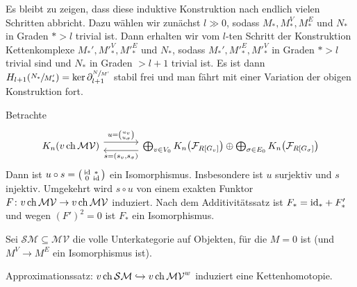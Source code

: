 \begin{beweis}
	Es bleibt zu zeigen, dass diese induktive Konstruktion nach endlich vielen Schritten abbricht. 
	Dazu wählen wir zunächst $l \gg 0$, sodass $M_*,M_*^V,M_*^E$ und $N_*$ in Graden $* > l$ trivial ist.
	Dann erhalten wir vom $l$-ten Schritt der Konstruktion Kettenkomplexe $M_*', {M'}_*^V, {M'}_*^E$ und $N_*$, sodass $M_*',{M'}_*^E, {M'}_*^V$ in Graden $* > l$ trivial sind und $N_*$ in Graden $> l+1$ trivial ist.
	Es ist dann $H_{l+1} \enbrace*{\sfrac{N_*}{M_*'}} = \ker \partial^{\sfrac{N}{M'}}_{l+1}$ stabil frei und man fährt mit einer Variation der obigen Konstruktion fort.
\end{beweis}

\begin{beweis}[name={von (2)}]
	Betrachte
	\[
		\begin{tikzcd}[sep=large]
			K_n \enbrace*{v \ch \mathcal{MV}} \rar["u=\binom{u_v}{u_\sigma}",yshift=1ex] & \bigoplus_{v \in V_0} K_n \enbrace*{\mathcal{F}_{R[G_v]}} \oplus \bigoplus_{\sigma \in E_0} K_n \enbrace*{\mathcal{F}_{R[G_\sigma]}} \lar["{s=(s_v,s_\sigma)}",yshift=-1ex]
		\end{tikzcd}
	\]
	Dann ist $u \circ s = \begin{psmallmatrix}
		\operatorname{id} & * \\ 0 & \operatorname{id}
	\end{psmallmatrix}$ ein Isomorphismus.
	Insbesondere ist $u$ surjektiv und $s$ injektiv.
	Umgekehrt wird $s \circ u$ von einem exakten Funktor $F \colon v \operatorname{ch} \mathcal{MV} \to v \operatorname{ch} \mathcal{MV}$ induziert.
	Nach dem Additivitätssatz ist $F_* = {\operatorname{id}_*} + F_*'$ und wegen $(F')^2=0$ ist $F_*$ ein Isomorphismus.
\end{beweis}

\begin{definition}
	Sei $\mathcal{SM} \subseteq \mathcal{MV}$ die volle Unterkategorie auf Objekten, für die $M=0$ ist (und $M^V \to M^E$ ein Isomorphismus ist). 
\end{definition}

\begin{bemerkung}
	Approximationssatz: $v \operatorname{ch} \mathcal{SM} \hookrightarrow v \operatorname{ch} \mathcal{MV}^w$ induziert eine Kettenhomotopie.
\end{bemerkung}

\begin{beweis}[{name={von (3)}}]
\end{beweis}




